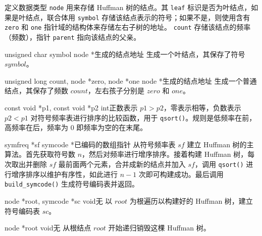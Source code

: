定义数据类型 \verb|node| 用来存储 Huffman 树的结点。其 \verb|leaf| 标识是否为叶结点，如果是叶结点，联合体用 \verb|symbol| 存储该结点表示的符号；如果不是，则使用含有 \verb|zero| 和 \verb|one| 指针域的结构体来存储左右子树的地址。
 \verb|count| 存储该结点的频率（频数），指针 \verb|parent| 指向该结点的父亲。

{unsigned char symbol}
{node *}{生成的结点地址}
{生成一个叶结点，其保存了符号 $symbol$。}

{unsigned long count, node *zero, node *one}
{node *}{生成的结点地址}
{生成一个普通结点，其保存了频数 $count$，左右孩子分别是 $zero$ 和 $one$。}

{const void *p1, const void *p2}
{int}{正数表示 $p1 > p2$，零表示相等，负数表示 $p2<p1$}
{对符号频率表进行排序的比较函数，用于 {\tt qsort()}。规则是低频率在前，高频率在后，频率为 0 即频率为空的在末尾。}

{symfreq *sf}
{symcode *}{已编码的数组指针}
{从符号频率表 $sf$ 建立 Huffman 树的主算法。首先获取符号数 $n$，然后对频率进行增序排序。接着构建 Huffman 树，每次取出并删除 $sf$ 最前面两个元素，合并成新的结点并加入 $sf$，调用 {\tt qsort()} 进行增序排序以维护有序性，如此进行 $n-1$ 次即可构建成功。最后调用 {\tt build\_symcode()} 生成符号编码表并返回。}

{node *root, symcode *sc}
{void}{无}
{以 $root$ 为根遍历以构建好的 Huffman 树，建立符号编码表 $sc$。}

{node *root}
{void}{无}
{从根结点 $root$ 开始递归销毁这棵 Huffman 树。}
